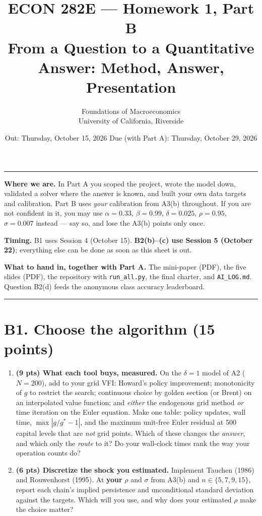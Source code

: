 \documentclass[11pt]{article}
\title{\vspace{-2em}\textbf{ECON 282E --- Homework 1, Part B}\\[2mm]
       \large From a Question to a Quantitative Answer: Method, Answer, Presentation}
\author{Foundations of Macroeconomics \\ University of California, Riverside}
\date{Out: Thursday, October 15, 2026 \quad\textbullet\quad Due (with Part A): Thursday, October 29, 2026}
\newif\ifsolutions \solutionsfalse
\newcommand{\solution}[1]{\ifsolutions\medskip
  {\color{blue!45!black}\textbf{Solution.} #1}\medskip\fi}
\begin{document}
\maketitle
\thispagestyle{empty}

\noindent\rule{\linewidth}{0.4pt}\par
\small
\textbf{Where we are.} In Part A you scoped the project, wrote the model down, validated a solver
where the answer is known, and built your own data targets and calibration. Part B uses
\emph{your} calibration from A3(b) throughout. If you are not confident in it, you may use
$\alpha=0.33$, $\beta=0.99$, $\delta=0.025$, $\rho=0.95$, $\sigma=0.007$ instead --- say so, and lose
the A3(b) points only once.

\textbf{Timing.} B1 uses Session 4 (October 15). \textbf{B2(b)--(c) use Session 5 (October 22)};
everything else can be done as soon as this sheet is out.

\textbf{What to hand in, together with Part A.} The mini-paper (PDF), the five slides (PDF), the
repository with \texttt{run\_all.py}, the final charter, and \texttt{AI\_LOG.md}. Question B2(d) feeds the
anonymous class accuracy leaderboard.
\normalsize\par
\noindent\rule{\linewidth}{0.4pt}\par

\section*{B1. Choose the algorithm (15 points)}

\begin{enumerate}[label=(\alph*), leftmargin=*]

\item \textbf{(9 pts) What each tool buys, measured.} On the $\delta=1$ model of A2 ($N=200$), add
to your grid VFI: Howard's policy improvement; monotonicity of $g$ to restrict the search;
continuous choice by golden section (or Brent) on an interpolated value function; and
\emph{either} the endogenous grid method \emph{or} time iteration on the Euler equation. Make one
table: policy updates, wall time, $\max|g/g^*-1|$, and the maximum unit-free Euler residual at 500
capital levels that are \emph{not} grid points. Which of these changes the \emph{answer}, and which
only the \emph{route} to it? Do your wall-clock times rank the way your operation counts do?

\solution{\keyBone}

\item \textbf{(6 pts) Discretize the shock you estimated.} Implement Tauchen (1986) and
Rouwenhorst (1995). At \textbf{your} $\rho$ and $\sigma$ from A3(b) and $n\in\{5,7,9,15\}$, report
each chain's implied persistence and unconditional standard deviation against the targets. Which
will you use, and why does your estimated $\rho$ make the choice matter?

\solution{\keyBtwo}

\end{enumerate}
\end{document}
